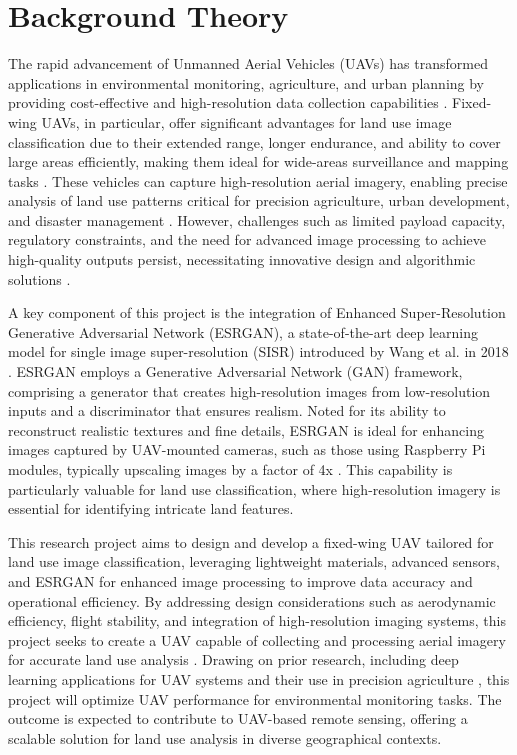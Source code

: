 \section{Background Theory}
The rapid advancement of Unmanned Aerial Vehicles (UAVs) has transformed applications in environmental monitoring, agriculture, and urban planning by providing cost-effective and high-resolution data collection capabilities \cite{aabid2022reviews} \cite{baballe2022review}. Fixed-wing UAVs, in particular, offer significant advantages for land use image classification due to their extended range, longer endurance, and ability to cover large areas efficiently, making them ideal for wide-areas surveillance and mapping tasks \cite{aabid2022reviews}. These vehicles can capture high-resolution aerial imagery, enabling precise analysis of land use patterns critical for precision agriculture, urban development, and disaster management \cite{baballe2022review} \cite{shakhatreh2019survey}. However, challenges such as limited payload capacity, regulatory constraints, and the need for advanced image processing to achieve high-quality outputs persist, necessitating innovative design and algorithmic solutions \cite{aabid2022reviews}\cite{baballe2022review} .

A key component of this project is the integration of Enhanced Super-Resolution Generative Adversarial Network (ESRGAN), a state-of-the-art deep learning model for single image super-resolution (SISR) introduced by Wang et al. in 2018 \cite{wang2018esrgan}. ESRGAN employs a Generative Adversarial Network (GAN) framework, comprising a generator that creates high-resolution images from low-resolution inputs and a discriminator that ensures realism. Noted for its ability to reconstruct realistic textures and fine details, ESRGAN is ideal for enhancing images captured by UAV-mounted cameras, such as those using Raspberry Pi modules, typically upscaling images by a factor of 4x \cite{wang2018esrgan}. This capability is particularly valuable for land use classification, where high-resolution imagery is essential for identifying intricate land features.

This research project aims to design and develop a fixed-wing UAV tailored for land use image classification, leveraging lightweight materials, advanced sensors, and ESRGAN for enhanced image processing to improve data accuracy and operational efficiency. By addressing design considerations such as aerodynamic efficiency, flight stability, and integration of high-resolution imaging systems, this project seeks to create a UAV capable of collecting and processing aerial imagery for accurate land use analysis \cite{aabid2022reviews}\cite{baballe2022review} . Drawing on prior research, including deep learning applications for UAV systems and their use in precision agriculture \cite{baballe2022review}, this project will optimize UAV performance for environmental monitoring tasks. The outcome is expected to contribute to UAV-based remote sensing, offering a scalable solution for land use analysis in diverse geographical contexts.

